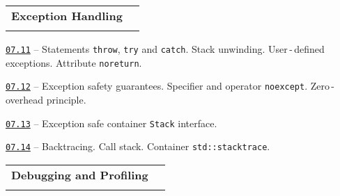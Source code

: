 \documentclass[a4paper,12pt]{article}
\renewenvironment{itemize}
{
    \begin{list}{\labelitemi}
    {
      \setlength{\topsep}{0pt}
      \setlength{\partopsep}{0pt}
      \setlength{\parskip}{0pt}
      \setlength{\itemsep}{0pt}
      \setlength{\parsep}{0pt}
      \setlength{\leftmargin}{14.5pt}
    }
}{\end{list}}
\begin{document}
\bigskip\medskip

\begin{tabular}{!{\vrule width 1pt}L{3.9cm}!{\vrule width 1pt}L{15.1cm}!{\vrule width 0pt}} 


\textbf{Exception Handling} & \\


\end{tabular}

\medskip\smallskip

\begin{itemize}

    \item \href{https://github.com/i-s-m-mipt/Education/blob/master/projects/examples/source/07.11.cpp}{\texttt{07.11}} -- Statements \lstinline{throw}, \lstinline{try} and \lstinline{catch}. Stack unwinding. User\,-\,defined exceptions. Attribute \lstinline{noreturn}. 

    \smallskip

    \item \href{https://github.com/i-s-m-mipt/Education/blob/master/projects/examples/source/07.12.cpp}{\texttt{07.12}} -- Exception safety guarantees. Specifier and operator \lstinline{noexcept}. Zero\,-\,overhead principle.

    \smallskip

    \item \href{https://github.com/i-s-m-mipt/Education/blob/master/projects/examples/source/07.13.cpp}{\texttt{07.13}} -- Exception safe container \lstinline{Stack} interface.

    \smallskip

    \item \href{https://github.com/i-s-m-mipt/Education/blob/master/projects/examples/source/07.14.cpp}{\texttt{07.14}} -- Backtracing. Call stack. Container \lstinline{std::stacktrace}.

\end{itemize}

\bigskip\medskip

\begin{tabular}{!{\vrule width 1pt}L{4.8cm}!{\vrule width 1pt}L{14.2cm}!{\vrule width 0pt}} 


\textbf{Debugging and Profiling} & \\


\end{tabular}
\end{document}
